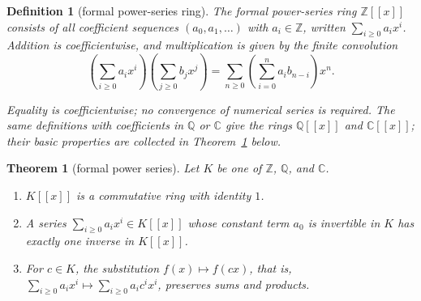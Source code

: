\documentclass[11pt]{article}
\theoremstyle{ntstyle}
\newtheorem{theorem}{Theorem}[subsection]
\newtheorem{definition}{Definition}[subsection]
\begin{document}
\begin{definition}[formal power-series ring]\label{def:3.5.2} The
	formal power-series ring $\mathbb{Z}[[x]]$ consists of all coefficient
	sequences $(a_0,a_1,\ldots)$ with $a_i\in\mathbb{Z}$, written
	$\sum_{i\ge0}a_ix^i$. Addition is coefficientwise, and multiplication is
	given by the finite convolution
	\[
		\left(\sum_{i\ge0}a_ix^i\right)\left(\sum_{j\ge0}b_jx^j\right)
		=\sum_{n\ge0}\left(\sum_{i=0}^{n}a_i b_{n-i}\right)x^n.
	\]

	Equality is coefficientwise; no convergence of numerical series is required.
	The same definitions with coefficients in $\mathbb{Q}$ or $\mathbb{C}$ give the rings
	$\mathbb{Q}[[x]]$ and $\mathbb{C}[[x]]$; their basic properties are collected in Theorem~\ref{thm:3.5.10} below.

\end{definition}
\begin{theorem}[formal power series]\label{thm:3.5.10}
	Let $K$ be one of $\mathbb{Z}$, $\mathbb{Q}$, and $\mathbb{C}$.

	\begin{enumerate}[label={\alph*)}]
		\item $K[[x]]$ is a commutative ring with identity $1$.
		\item A series $\sum_{i\ge0}a_ix^i\in K[[x]]$ whose constant term $a_0$ is
		      invertible in $K$ has exactly one inverse in $K[[x]]$.
		\item For $c\in K$, the substitution $f(x)\mapsto f(cx)$, that is,
		      $\sum_{i\ge0}a_ix^i\mapsto\sum_{i\ge0}a_ic^ix^i$, preserves sums and products.
	\end{enumerate}

\end{theorem}
\end{document}
